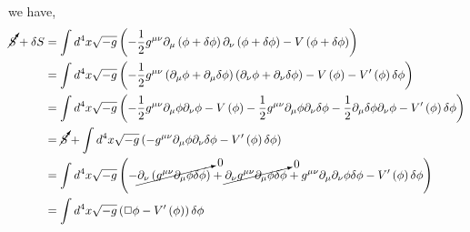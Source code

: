 we have,
\begin{equation}
\begin{split}
\cancelto{}S + \delta S &= \int d^{4}x\sqrt{-g}\left(-\frac{1}{2}g^{\mu\nu}\partial_{\mu}\left(\phi + \delta \phi\right)\partial_{\nu}\left(\phi + \delta \phi\right) - V\left(\phi + \delta \phi\right)\right)\\
&= \int d^{4}x\sqrt{-g}\left(-\frac{1}{2}g^{\mu\nu}\left(\partial_{\mu}\phi + \partial_{\mu}\delta \phi\right)\left(\partial_{\nu}\phi + \partial_{\nu}\delta \phi\right) - V\left(\phi\right) - V^{\prime}\left(\phi\right)\delta \phi\right)\\
&= \int d^{4}x\sqrt{-g}\left(-\frac{1}{2}g^{\mu\nu}\partial_{\mu}\phi\partial_{\nu}\phi - V\left(\phi\right) - \frac{1}{2}g^{\mu\nu}\partial_{\mu}\phi\partial_{\nu}\delta\phi -\frac{1}{2}\partial_{\mu}\delta\phi\partial_{\nu}\phi - V^{\prime}\left(\phi\right)\delta\phi\right)\\
&= \cancelto{}S + \int d^{4}x\sqrt{-g}\left(-g^{\mu\nu}\partial_{\mu}\phi\partial_{\nu}\delta\phi - V^{\prime}\left(\phi\right)\delta\phi\right)\\
&= \int d^{4}x\sqrt{-g}\left(-\cancelto{0}{\partial_{\nu}\left(g^{\mu\nu}\partial_{\mu}\phi\delta\phi\right)} + \cancelto{0}{\partial_{\nu}g^{\mu\nu}\partial_{\mu}\phi\delta\phi} + g^{\mu\nu}\partial_{\mu}\partial_{\nu}\phi\delta\phi - V^{\prime}\left(\phi\right)\delta\phi\right)\\
&= \int d^{4}x\sqrt{-g}\left(\Box\phi - V^{\prime}\left(\phi\right)\right)\delta\phi
\end{split}
\end{equation}
